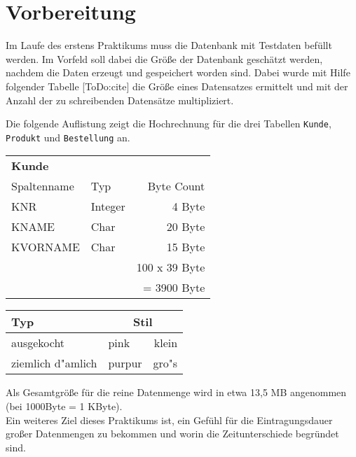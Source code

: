 \chapter{Vorbereitung}
Im Laufe des erstens Praktikums muss die Datenbank mit Testdaten befüllt werden. Im Vorfeld soll dabei die Größe der Datenbank geschätzt werden, nachdem die Daten erzeugt und gespeichert worden sind. 
Dabei wurde mit Hilfe folgender Tabelle [ToDo:cite] die Größe eines Datensatzes ermittelt und mit der Anzahl der zu schreibenden Datensätze multipliziert.

Die folgende Auflistung zeigt die Hochrechnung für die drei Tabellen \texttt{Kunde}, \texttt{Produkt} und \texttt{Bestellung} an.\\

\begin{tabular}{|l|l|r|} \hline\hline
\multicolumn{3}{|l|}{ \textbf{Kunde}}\\
Spaltenname & Typ & Byte Count\\
\hline 
KNR & Integer & 4 Byte\\
KNAME & Char & 20 Byte \\ 
KVORNAME & Char & 15 Byte \\ \hline
\multicolumn{2}{|r}{} & 100 x 39 Byte\\
\multicolumn{2}{|r}{} & = 3900 Byte \\ \hline
\end{tabular}


\begin{tabular}{|l|l|r|} \hline\hline
\textbf{Typ} & \multicolumn{2}{c|}{\textbf{Stil}}\\
\hline
ausgekocht & pink & klein\arrayrulewidth2pt\vline\\
\cline{2-3}
ziemlich d"amlich & purpur & gro"s \\ \hline\hline
\end{tabular}

Als Gesamtgröße für die reine Datenmenge wird in etwa 13,5 MB angenommen (bei 1000Byte = 1 KByte).\\

Ein weiteres Ziel dieses Praktikums ist, ein Gefühl für die Eintragungsdauer großer Datenmengen zu bekommen und worin die Zeitunterschiede begründet sind.